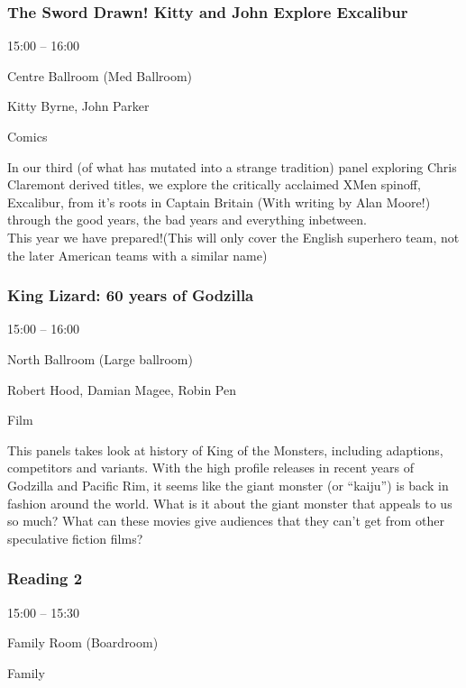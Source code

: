 \documentclass{scrreprt}
\begin{document}
\begin{multicols}{2}
\subsubsection*{The Sword Drawn! Kitty and John Explore Excalibur}\begin{description}
\setlength{\itemsep}{0pt}
\setlength{\parsep}{0pt}
\setlength{\parskip}{0pt}
\item[Time:]{15:00 -- 16:00}
\item[Venue:]{Centre Ballroom (Med Ballroom)}
\item[People:]{Kitty Byrne, John Parker}
\item[Tags:]{Comics}\end{description}
In our third (of what has mutated into a strange tradition) panel exploring Chris Claremont derived titles, we explore the critically acclaimed XMen spinoff, Excalibur, from it's roots in Captain Britain (With writing by Alan Moore!) through the good years, the bad years and everything inbetween. \\This year we have prepared!(This will only cover the English superhero team, not the later American teams with a similar name)
\subsubsection*{King Lizard: 60 years of Godzilla}\begin{description}
\setlength{\itemsep}{0pt}
\setlength{\parsep}{0pt}
\setlength{\parskip}{0pt}
\item[Time:]{15:00 -- 16:00}
\item[Venue:]{North Ballroom (Large ballroom)}
\item[People:]{Robert Hood, Damian Magee, Robin Pen}
\item[Tags:]{Film}\end{description}
This panels takes look at history of King of the Monsters, including adaptions, competitors and variants. With the high profile releases in recent years of Godzilla and Pacific Rim, it seems like the giant monster (or “kaiju”) is back in fashion around the world. What is it about the giant monster that appeals to us so much? What can these movies give audiences that they can’t get from other speculative fiction films?
\subsubsection*{Reading 2}\begin{description}
\setlength{\itemsep}{0pt}
\setlength{\parsep}{0pt}
\setlength{\parskip}{0pt}
\item[Time:]{15:00 -- 15:30}
\item[Venue:]{Family Room (Boardroom)}
\item[Tags:]{Family}\end{description}


\end{multicols}
\end{document}
